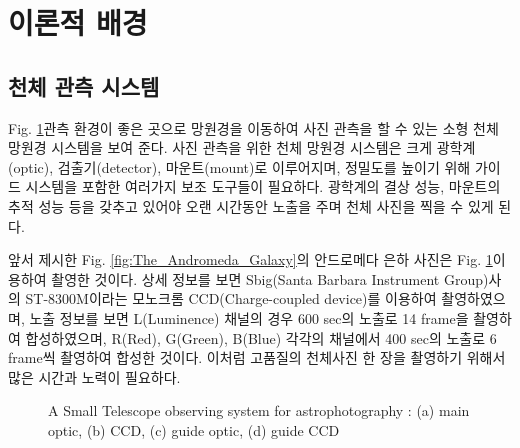 \section{이론적 배경}

\subsection{천체 관측 시스템}

Fig. \ref{fig:observing_system}\은 관측 환경이 좋은 곳으로 망원경을 이동하여 사진 관측을 할 수 있는 소형 천체 망원경 시스템을 보여 준다. 사진 관측을 위한 천체 망원경 시스템은 크게 광학계(optic), 검출기(detector), 마운트(mount)로 이루어지며, 정밀도를 높이기 위해 가이드 시스템을 포함한 여러가지 보조 도구들이 필요하다. 광학계의 결상 성능, 마운트의 추적 성능 등을 갖추고 있어야 오랜 시간동안 노출을 주며 천체 사진을 찍을 수 있게 된다. 

앞서 제시한 Fig. \ref{fig:The_Andromeda_Galaxy}의 안드로메다 은하 사진은 Fig. \ref{fig:observing_system}\을 이용하여 촬영한 것이다. 상세 정보를 보면 Sbig(Santa Barbara Instrument Group)사의  ST-8300M이라는 모노크롬 CCD(Charge-coupled device)를 이용하여 촬영하였으며, 노출 정보를 보면 L(Luminence) 채널의 경우 600 sec의 노출로 14 frame을 촬영하여 합성하였으며, R(Red), G(Green), B(Blue) 각각의 채널에서 400 sec의 노출로 6 frame씩 촬영하여 합성한 것이다. 이처럼 고품질의 천체사진 한 장을 촬영하기 위해서 많은 시간과 노력이 필요하다. 

\begin{figure}[h]
	\begin{center}
	\end{center}
	\caption{A Small Telescope observing system for astrophotography : (a) main optic, (b) CCD, (c) guide optic, (d) guide CCD}
	\label{fig:observing_system}
\end{figure}


